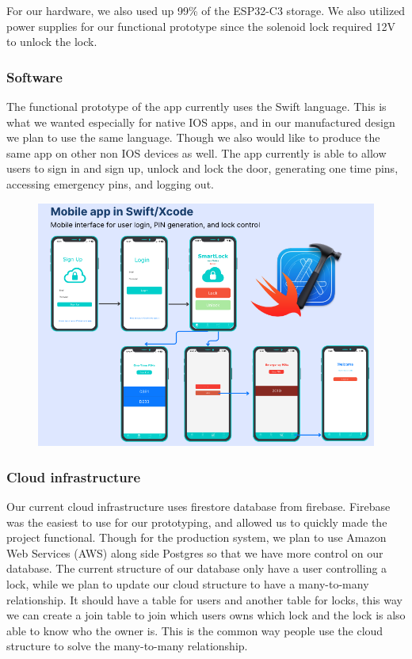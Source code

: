 For our hardware, we also used up 99\% of the ESP32-C3 storage. We also utilized power supplies for our functional prototype since the solenoid lock required 12V to unlock the lock. 

\subsubsection{Software}

The functional prototype of the app currently uses the Swift language. This is what we wanted especially for native IOS apps, and in our manufactured design we plan to use the same language. Though we also would like to produce the same app on other non IOS devices as well. The app currently is able to allow users to sign in and sign up, unlock and lock the door, generating one time pins, accessing emergency pins, and logging out. 

\begin{figure}[!ht]
    \centering
    \includegraphics[width=1\textwidth]{img/softwareComponents.png}
    \label{fig:softwareComponents}
\end{figure}

\subsubsection{Cloud infrastructure}

Our current cloud infrastructure uses firestore database from firebase. Firebase was the easiest to use for our prototyping, and allowed us to quickly made the project functional. Though for the production system, we plan to use Amazon Web Services (AWS) along side Postgres so that we have more control on our database.  The current structure of our database only have a user controlling a lock, while we plan to update our cloud structure to have a many-to-many relationship. It should have a table for users and another table for locks, this way we can create a join table to join which users owns which lock and the lock is also able to know who the owner is. This is the common way people use the cloud structure to solve the many-to-many relationship.


